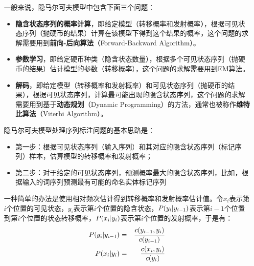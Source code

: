 \parinterval 一般来说，隐马尔可夫模型中包含下面三个问题：

\begin{itemize}
\vspace{0.5em}
\item {\small\sffamily\bfseries{隐含状态序列的概率计算}}，即给定模型（转移概率和发射概率），根据可见状态序列（抛硬币的结果）计算在该模型下得到这个结果的概率，这个问题的求解需要用到{\small\sffamily\bfseries{前向-后向算法}}（Forward-Backward Algorithm）。
\vspace{0.5em}
\item {\small\sffamily\bfseries{参数学习}}，即给定硬币种类（隐含状态数量），根据多个可见状态序列（抛硬币的结果）估计模型的参数（转移概率），这个问题的求解需要用到EM算法。
\vspace{0.5em}
\item {\small\sffamily\bfseries{解码}}，即给定模型（转移概率和发射概率）和可见状态序列（抛硬币的结果），根据可见状态序列，计算最可能出现的隐含状态序列，这个问题的求解需要用到基于{\small\sffamily\bfseries{动态规划}}（Dynamic Programming）的方法，通常也被称作{\small\sffamily\bfseries{维特比算法}}（Viterbi Algorithm）。
\vspace{0.5em}
\end{itemize}

\parinterval 隐马尔可夫模型处理序列标注问题的基本思路是：

\begin{itemize}
\vspace{0.5em}
\item 第一步：根据可见状态序列（输入序列）和其对应的隐含状态序列（标记序列）样本，估算模型的转移概率和发射概率；
\vspace{0.5em}
\item 第二步：对于给定的可见状态序列，预测概率最大的隐含状态序列，比如，根据输入的词序列预测最有可能的命名实体标记序列
\vspace{0.5em}
\end{itemize}

\parinterval 一种简单的办法是使用相对频次估计得到转移概率和发射概率估计值。令$x_i$表示第$i$个位置的可见状态，$y_i$表示第$i$个位置的隐含状态，${P}(y_i|y_{i-1})$表示第$i-1$个位置到第$i$个位置的状态转移概率，${P}(x_i|y_{i}) $表示第$i$个位置的发射概率，于是有：
\begin{eqnarray}
{P}(y_i|y_{i-1}) &=& \frac{{c}(y_{i-1},y_i)}{{c}(y_{i-1})}
\label{eq:3.3-1}\\
{P}(x_i|y_{i}) &=& \frac{{c}(x_i,y_i)}{{c}(y_i)}
\label{eq:3.3-2}
\end{eqnarray}

